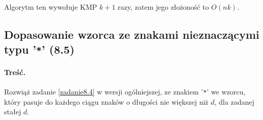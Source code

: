 Algorytm ten wywołuje KMP $k+1$ razy, zatem jego złożoność to $O(nk)$.

\subsection{Dopasowanie wzorca ze znakami nieznaczącymi typu '\texttt{*}' (8.5)}
\paragraph{Treść.}
Rozwiąż zadanie \ref{zadanie8.4} w wersji ogólniejszej, ze znakiem '\texttt{*}' we wzorcu, który pasuje do każdego ciągu znaków o długości nie większej niż $d$, dla zadanej stałej $d$.
